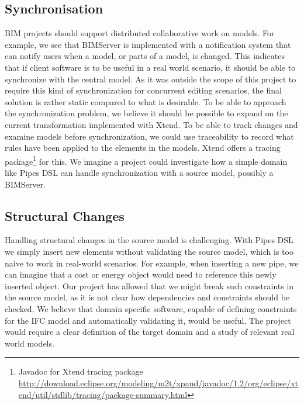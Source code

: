 \subsection{Synchronisation}
BIM projects should support distributed collaborative work on models. For example, we see that BIMServer is implemented with a notification system that can notify users when a model, or parts of a model, is changed. This indicates that if client software is to be useful in a real world scenario, it should be able to synchronize with the central model. As it was outside the scope of this project to require this kind of synchronization for concurrent editing scenarios, the final solution is rather static compared to what is desirable. %
To be able to approach the synchronization problem, we believe it should be possible to expand on the current transformation implemented with Xtend. To be able to track changes and examine models before synchronization, we could use traceability\cite{czarnecki06} to record what rules have been applied to the elements in the models. Xtend offers a tracing package\footnote{Javadoc for Xtend tracing package \url{http://download.eclipse.org/modeling/m2t/xpand/javadoc/1.2/org/eclipse/xtend/util/stdlib/tracing/package-summary.html}} for this. We imagine a project could investigate how a simple domain like Pipes DSL can handle synchronization with a source model, possibly a BIMServer.

\subsection{Structural Changes}
Handling structural changes in the source model is challenging. With Pipes DSL we simply insert new elements without validating the source model, which is too naive to work in real-world scenarios. For example, when inserting a new pipe, we can imagine that a cost or energy object would need to reference this newly inserted object. Our project has allowed that we might break such constraints in the source model, as it is not clear how dependencies and constraints should be checked. We believe that domain specific software, capable of defining constraints for the IFC model and automatically validating it, would be useful. The project would require a clear definition of the target domain and a study of relevant real world models.

